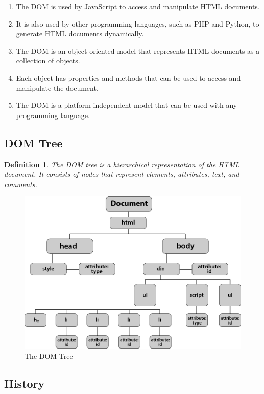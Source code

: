 \documentclass[11pt]{article}
\newtheorem{dfn}[thm]{Definition}
\begin{document}
\begin{enumerate}
    \item The DOM is used by JavaScript to access and manipulate HTML documents.
    \item It is also used by other programming languages, such as PHP and Python, to generate HTML documents dynamically.
    \item The DOM is an object-oriented model that represents HTML documents as a collection of objects.
    \item Each object has properties and methods that can be used to access and manipulate the document.
    \item The DOM is a platform-independent model that can be used with any programming language.
\end{enumerate}

\subsection{DOM Tree}

\begin{dfn}
    The DOM tree is a hierarchical representation of the HTML document. It consists of nodes that represent elements, attributes, text, and comments.
\end{dfn}

\begin{figure}[H]
    \centering
    \includegraphics[width=.95\textwidth]{0*Sk5AAj4ze_bDFPA0.png}
    \caption{The DOM Tree}
\end{figure}


\subsection{History}
\end{document}
